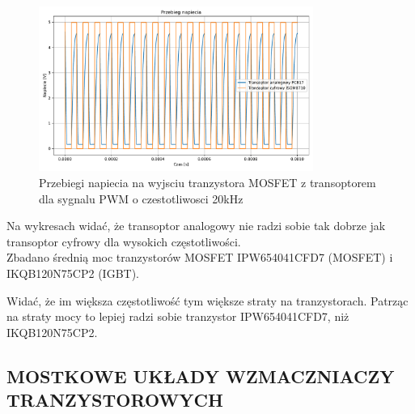 \documentclass[11pt]{article}
\begin{document}
\begin{figure}[H]
\centering
\includegraphics[width=0.8\textwidth]{aun1_gate_circuit_digital_vs_analog_20khz.pdf}
\caption{Przebiegi napiecia na wyjsciu tranzystora MOSFET z transoptorem dla sygnalu PWM o czestotliwosci 20kHz}
\end{figure}

Na wykresach widać, że transoptor analogowy nie radzi sobie tak dobrze jak transoptor cyfrowy dla wysokich częstotliwości.\\

Zbadano średnią moc tranzystorów MOSFET IPW654041CFD7 (MOSFET) i IKQB120N75CP2 (IGBT). \\

\begin{table}[H]
\centering
{}
\caption{Średnia moc wytracana na tranzystorze w zależności od częstotliwości}
\end{table}

Widać, że im większa częstotliwość tym większe straty na tranzystorach. Patrząc na straty mocy to lepiej radzi sobie tranzystor IPW654041CFD7, niż IKQB120N75CP2.\\

\subsection{MOSTKOWE UKŁADY WZMACZNIACZY TRANZYSTOROWYCH}
\end{document}
